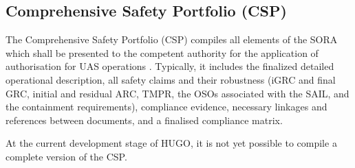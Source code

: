 \subsection{Comprehensive Safety Portfolio (CSP)}
The Comprehensive Safety Portfolio (CSP) compiles all elements of the SORA which shall be presented to the competent authority for the application of authorisation for UAS operations \cite{Jarus_Annex_F}. Typically, it includes the finalized detailed operational description, all safety claims and their robustness (iGRC and final GRC, initial and residual ARC, TMPR, the OSOs associated with the SAIL, and the containment requirements), compliance evidence, necessary linkages and references between documents, and a finalised compliance matrix.

At the current development stage of HUGO, it is not yet possible to compile a complete version of the CSP.

\begingroup
\renewcommand\thefootnote{}
\addtocounter{footnote}{-1}
\endgroup
